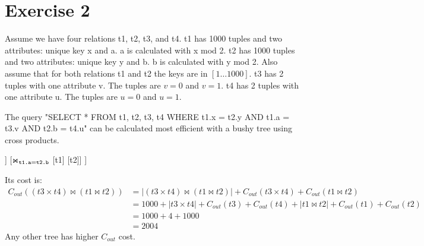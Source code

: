\documentclass{scrartcl}
\newcommand{\join}{\Join}
\newcommand{\mtt}[1]{\text{\texttt{#1}}}
\begin{document}
\section*{Exercise 2}

Assume we have four relations t1, t2, t3, and t4. t1 has 1000 tuples and two attributes: unique key x and a. a is
calculated with x mod 2. t2 has 1000 tuples and two attributes: unique key y and b. b is calculated with y mod 2.
Also assume that for both relations t1 and t2 the keys are in $[1\dots1000]$.
t3 has 2 tuples with one attribute v. The tuples are $v = 0$ and $v = 1$. t4 has 2 tuples with one attribute u. The
tuples are $u = 0$ and $u = 1$.

The query "SELECT * FROM t1, t2, t3, t4 WHERE t1.x = t2.y AND t1.a = t3.v AND t2.b = t4.u" can be calculated most
efficient with a bushy tree using cross products.

\begin{center}
\begin{forest}
[$\join_{\mtt{t1.a=t3.v} \wedge \mtt{t2.b=t4.u}}$
    [$\times$ [t3] [t4]]
    [$\join_{\mtt{t1.a} = \mtt{t2.b}}$ [t1] [t2]]
]
\end{forest}
\end{center}

Its cost is:
\begin{align*}
C_{out}((t3 \times t4) \join (t1 \join t2)) &= |(t3 \times t4) \join (t1 \join t2)| + C_{out}(t3 \times t4) + C_{out}(t1 \join t2) \\
&= 1000 + |t3 \times t4| + C_{out}(t3) + C_{out}(t4) + |t1 \join t2| + C_{out}(t1) + C_{out}(t2) \\
&= 1000 + 4 + 1000 \\
&= 2004
\end{align*}
Any other tree has higher $C_{out}$ cost.
\end{document}
